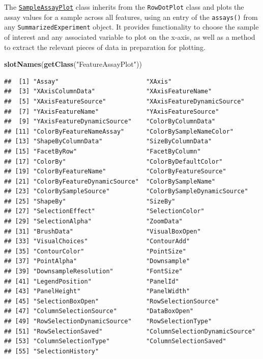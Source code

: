 \documentclass[
]{book}
\newenvironment{Shaded}{\begin{snugshade}}{\end{snugshade}}
\newcommand{\KeywordTok}[1]{\textcolor[rgb]{0.13,0.29,0.53}{\textbf{#1}}}
\newcommand{\NormalTok}[1]{#1}
\newcommand{\StringTok}[1]{\textcolor[rgb]{0.31,0.60,0.02}{#1}}
\begin{document}
The \href{https://isee.github.io/iSEE/reference/SampleAssayPlot-class.html}{\texttt{SampleAssayPlot}} class inherits from the \texttt{RowDotPlot} class and plots the assay values for a sample across all features, using an entry of the \texttt{assays()} from any \texttt{SummarizedExperiment} object.
It provides functionality to choose the sample of interest and any associated variable to plot on the x-axis, as well as a method to extract the relevant pieces of data in preparation for plotting.

\begin{Shaded}
\begin{Highlighting}[]
\KeywordTok{slotNames}\NormalTok{(}\KeywordTok{getClass}\NormalTok{(}\StringTok{"FeatureAssayPlot"}\NormalTok{))}
\end{Highlighting}
\end{Shaded}

\begin{verbatim}
##  [1] "Assay"                        "XAxis"                       
##  [3] "XAxisColumnData"              "XAxisFeatureName"            
##  [5] "XAxisFeatureSource"           "XAxisFeatureDynamicSource"   
##  [7] "YAxisFeatureName"             "YAxisFeatureSource"          
##  [9] "YAxisFeatureDynamicSource"    "ColorByColumnData"           
## [11] "ColorByFeatureNameAssay"      "ColorBySampleNameColor"      
## [13] "ShapeByColumnData"            "SizeByColumnData"            
## [15] "FacetByRow"                   "FacetByColumn"               
## [17] "ColorBy"                      "ColorByDefaultColor"         
## [19] "ColorByFeatureName"           "ColorByFeatureSource"        
## [21] "ColorByFeatureDynamicSource"  "ColorBySampleName"           
## [23] "ColorBySampleSource"          "ColorBySampleDynamicSource"  
## [25] "ShapeBy"                      "SizeBy"                      
## [27] "SelectionEffect"              "SelectionColor"              
## [29] "SelectionAlpha"               "ZoomData"                    
## [31] "BrushData"                    "VisualBoxOpen"               
## [33] "VisualChoices"                "ContourAdd"                  
## [35] "ContourColor"                 "PointSize"                   
## [37] "PointAlpha"                   "Downsample"                  
## [39] "DownsampleResolution"         "FontSize"                    
## [41] "LegendPosition"               "PanelId"                     
## [43] "PanelHeight"                  "PanelWidth"                  
## [45] "SelectionBoxOpen"             "RowSelectionSource"          
## [47] "ColumnSelectionSource"        "DataBoxOpen"                 
## [49] "RowSelectionDynamicSource"    "RowSelectionType"            
## [51] "RowSelectionSaved"            "ColumnSelectionDynamicSource"
## [53] "ColumnSelectionType"          "ColumnSelectionSaved"        
## [55] "SelectionHistory"
\end{verbatim}
\end{document}
